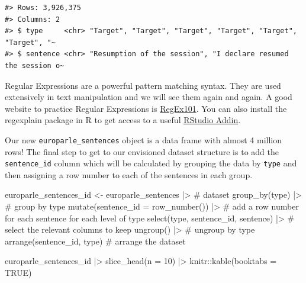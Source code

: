 \documentclass[
  letterpaper,
]{latex/krantz}
\newenvironment{Shaded}{\begin{snugshade}}{\end{snugshade}}
\newcommand{\AttributeTok}[1]{\textcolor[rgb]{0.40,0.45,0.13}{#1}}
\newcommand{\CommentTok}[1]{\textcolor[rgb]{0.37,0.37,0.37}{#1}}
\newcommand{\ConstantTok}[1]{\textcolor[rgb]{0.56,0.35,0.01}{#1}}
\newcommand{\DecValTok}[1]{\textcolor[rgb]{0.68,0.00,0.00}{#1}}
\newcommand{\FunctionTok}[1]{\textcolor[rgb]{0.28,0.35,0.67}{#1}}
\newcommand{\NormalTok}[1]{\textcolor[rgb]{0.00,0.23,0.31}{#1}}
\newcommand{\OtherTok}[1]{\textcolor[rgb]{0.00,0.23,0.31}{#1}}
\newcommand{\SpecialCharTok}[1]{\textcolor[rgb]{0.37,0.37,0.37}{#1}}
\begin{document}
\begin{verbatim}
#> Rows: 3,926,375
#> Columns: 2
#> $ type     <chr> "Target", "Target", "Target", "Target", "Target", "Target", "~
#> $ sentence <chr> "Resumption of the session", "I declare resumed the session o~
\end{verbatim}

\begin{tcolorbox}[enhanced jigsaw, toprule=.15mm, bottomtitle=1mm, coltitle=black, title=\textcolor{quarto-callout-warning-color}{\faExclamationTriangle}\hspace{0.5em}{Tip}, left=2mm, colframe=quarto-callout-warning-color-frame, bottomrule=.15mm, colbacktitle=quarto-callout-warning-color!10!white, leftrule=.75mm, colback=white, titlerule=0mm, breakable, toptitle=1mm, opacityback=0, arc=.35mm, rightrule=.15mm, opacitybacktitle=0.6]

Regular Expressions are a powerful pattern matching syntax. They are
used extensively in text manipulation and we will see them again and
again. A good website to practice Regular Expressions is
\href{https://regex101.com/}{RegEx101}. You can also install the
regexplain package in R to get access to a useful
\href{https://rstudio.github.io/rstudioaddins/}{RStudio Addin}.

\end{tcolorbox}

Our new \texttt{europarle\_sentences} object is a data frame with almost
4 million rows! The final step to get to our envisioned dataset
structure is to add the \texttt{sentence\_id} column which will be
calculated by grouping the data by \texttt{type} and then assigning a
row number to each of the sentences in each group.

\begin{Shaded}
\begin{Highlighting}[]
\NormalTok{europarle\_sentences\_id }\OtherTok{\textless{}{-}} 
\NormalTok{  europarle\_sentences }\SpecialCharTok{|\textgreater{}} \CommentTok{\# dataset}
  \FunctionTok{group\_by}\NormalTok{(type) }\SpecialCharTok{|\textgreater{}} \CommentTok{\# group by type}
  \FunctionTok{mutate}\NormalTok{(}\AttributeTok{sentence\_id =} \FunctionTok{row\_number}\NormalTok{()) }\SpecialCharTok{|\textgreater{}} \CommentTok{\# add a row number for each sentence for each level of type}
  \FunctionTok{select}\NormalTok{(type, sentence\_id, sentence) }\SpecialCharTok{|\textgreater{}} \CommentTok{\# select the relevant columns to keep}
  \FunctionTok{ungroup}\NormalTok{() }\SpecialCharTok{|\textgreater{}}  \CommentTok{\# ungroup by type}
  \FunctionTok{arrange}\NormalTok{(sentence\_id, type) }\CommentTok{\# arrange the dataset}

\NormalTok{europarle\_sentences\_id }\SpecialCharTok{|\textgreater{}} 
  \FunctionTok{slice\_head}\NormalTok{(}\AttributeTok{n =} \DecValTok{10}\NormalTok{) }\SpecialCharTok{|\textgreater{}} 
\NormalTok{  knitr}\SpecialCharTok{::}\FunctionTok{kable}\NormalTok{(}\AttributeTok{booktabs =} \ConstantTok{TRUE}\NormalTok{)}
\end{Highlighting}
\end{Shaded}
\end{document}
